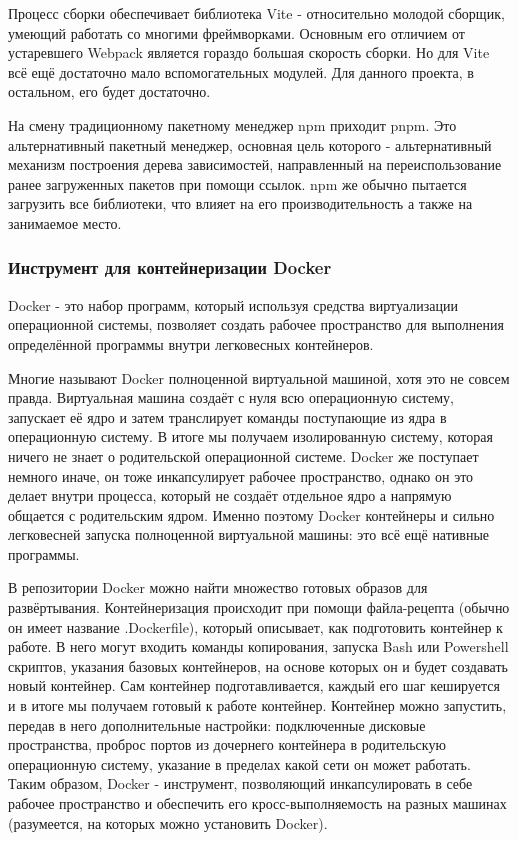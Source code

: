 \documentclass[14pt]{extarticle}
\begin{document}
Процесс сборки обеспечивает библиотека Vite - относительно молодой сборщик, 
умеющий работать со многими фреймворками. Основным его отличием от устаревшего Webpack является
гораздо большая скорость сборки. Но для Vite всё ещё достаточно мало вспомогательных
модулей. Для данного проекта, в остальном, его будет достаточно.

На смену традиционному пакетному менеджер npm приходит pnpm. Это альтернативный пакетный менеджер, 
основная цель которого - альтернативный механизм построения дерева зависимостей, направленный на переиспользование
ранее загруженных пакетов при помощи ссылок. npm же обычно пытается загрузить все библиотеки, что влияет на его 
производительность а также на занимаемое место. 

\subsubsection{Инструмент для контейнеризации Docker}

Docker - это набор программ, который используя средства виртуализации операционной системы, позволяет 
создать рабочее пространство для выполнения определённой программы внутри легковесных контейнеров.

Многие называют Docker полноценной виртуальной машиной, хотя это не совсем правда. Виртуальная машина
создаёт с нуля всю операционную систему, запускает её ядро и затем транслирует команды поступающие
из ядра в операционную систему. В итоге мы получаем изолированную систему, которая ничего не знает о 
родительской операционной системе. Docker же поступает немного иначе, он тоже инкапсулирует рабочее
пространство, однако он это делает внутри процесса, который не создаёт отдельное ядро а напрямую общается
с родительским ядром. Именно поэтому Docker контейнеры и сильно легковесней запуска полноценной виртуальной
машины: это всё ещё нативные программы.

В репозитории Docker можно найти множество готовых образов для развёртывания. Контейнеризация происходит при 
помощи файла-рецепта (обычно он имеет название .Dockerfile), который описывает, как подготовить контейнер к работе. 
В него могут входить команды копирования, запуска Bash или Powershell скриптов, указания базовых контейнеров, на основе которых
он и будет создавать новый контейнер. Сам контейнер подготавливается, каждый его шаг кешируется и в итоге мы получаем
готовый к работе контейнер. Контейнер можно запустить, передав в него дополнительные настройки: подключенные
дисковые пространства, проброс портов из дочернего контейнера в родительскую операционную систему, указание в пределах
какой сети он может работать. Таким образом, Docker - инструмент, позволяющий инкапсулировать в себе рабочее пространство
и обеспечить его кросс-выполняемость на разных машинах (разумеется, на которых можно установить Docker).
\end{document}
